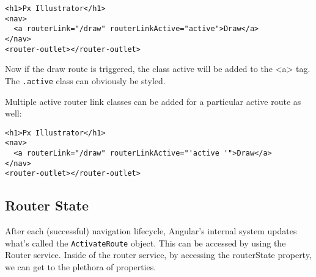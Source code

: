 \begin{lstlisting}
<h1>Px Illustrator</h1>
<nav>
  <a routerLink="/draw" routerLinkActive="active">Draw</a>
</nav>
<router-outlet></router-outlet>
\end{lstlisting}

Now if the draw route is triggered, the class active will 
be added to the <a> tag. The \lstinline{.active} class 
can obviously be styled.

Multiple active router link classes can be added for a 
particular active route as well: 

\begin{lstlisting}
<h1>Px Illustrator</h1>
<nav>
  <a routerLink="/draw" routerLinkActive="'active '">Draw</a>
</nav>
<router-outlet></router-outlet>
\end{lstlisting}

\subsection{Router State}
After each (successful) navigation lifecycle, Angular's internal system 
updates what's called the \lstinline{ActivateRoute} object. This can be
accessed by using the Router service. Inside of the router service, by 
accessing the routerState property, we can get to the plethora of 
properties.
\\
\\
